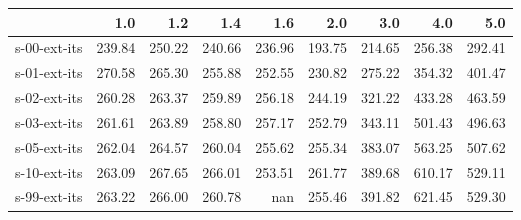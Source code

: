 \begin{tabular}{lrrrrrrrr}
\toprule
{} &    1.0 &    1.2 &    1.4 &    1.6 &    2.0 &    3.0 &    4.0 &    5.0 \\
\midrule
s-00-ext-its & 239.84 & 250.22 & 240.66 & 236.96 & 193.75 & 214.65 & 256.38 & 292.41 \\
s-01-ext-its & 270.58 & 265.30 & 255.88 & 252.55 & 230.82 & 275.22 & 354.32 & 401.47 \\
s-02-ext-its & 260.28 & 263.37 & 259.89 & 256.18 & 244.19 & 321.22 & 433.28 & 463.59 \\
s-03-ext-its & 261.61 & 263.89 & 258.80 & 257.17 & 252.79 & 343.11 & 501.43 & 496.63 \\
s-05-ext-its & 262.04 & 264.57 & 260.04 & 255.62 & 255.34 & 383.07 & 563.25 & 507.62 \\
s-10-ext-its & 263.09 & 267.65 & 266.01 & 253.51 & 261.77 & 389.68 & 610.17 & 529.11 \\
s-99-ext-its & 263.22 & 266.00 & 260.78 &    nan & 255.46 & 391.82 & 621.45 & 529.30 \\
\bottomrule
\end{tabular}
